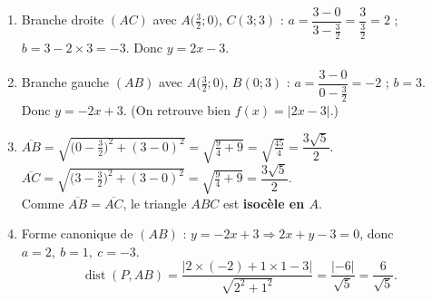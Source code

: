 \documentclass[11pt,a4paper]{article}
\newcommand{\exercice}[1]{\medskip\noindent{\color{primarydark}\bfseries\large Exercice #1}\par\nopagebreak\smallskip}
\begin{document}
\exercice{4}
\begin{enumerate}[label=\alph*),leftmargin=1.8em,topsep=2pt]
  \item Branche droite $(AC)$ avec $A\big(\tfrac32;0\big)$, $C(3;3)$ : $a=\dfrac{3-0}{3-\tfrac32}=\dfrac{3}{\tfrac32}=2$ ; $b=3-2\times 3=-3$. Donc $\boxed{y=2x-3}$.
  \item Branche gauche $(AB)$ avec $A\big(\tfrac32;0\big)$, $B(0;3)$ : $a=\dfrac{3-0}{0-\tfrac32}=-2$ ; $b=3$. Donc $\boxed{y=-2x+3}$.
        (On retrouve bien $f(x)=\lvert 2x-3\rvert$.)
  \item $\overline{AB}=\sqrt{\big(0-\tfrac32\big)^2+(3-0)^2}=\sqrt{\tfrac94+9}=\sqrt{\tfrac{45}{4}}=\dfrac{3\sqrt5}{2}$.\\
        $\overline{AC}=\sqrt{\big(3-\tfrac32\big)^2+(3-0)^2}=\sqrt{\tfrac94+9}=\dfrac{3\sqrt5}{2}$.\\
        Comme $\overline{AB}=\overline{AC}$, le triangle $ABC$ est \textbf{isocèle en $A$}. \checkmark
  \item Forme canonique de $(AB)$ : $y=-2x+3\Rightarrow 2x+y-3=0$, donc $a=2,\ b=1,\ c=-3$.
        \[ \operatorname{dist}(P,AB)=\frac{\lvert 2\times(-2)+1\times 1-3\rvert}{\sqrt{2^2+1^2}}=\frac{\lvert -6\rvert}{\sqrt5}=\boxed{\dfrac{6}{\sqrt5}}. \]
\end{enumerate}
\end{document}
